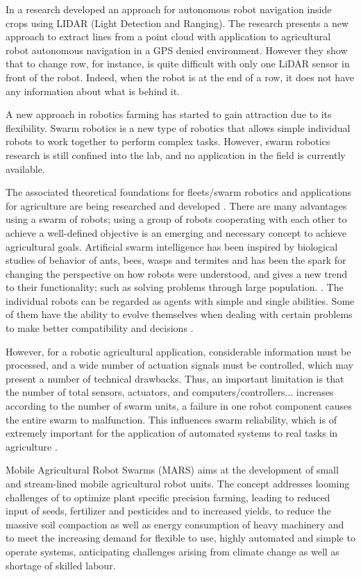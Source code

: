 \documentclass[review]{elsarticle}
\begin{document}
    In a research \cite{Malavazi_2018} developed an approach for autonomous robot navigation inside crops using LIDAR (Light Detection and Ranging). The research presents a new approach to extract lines from a point cloud with application to agricultural robot autonomous navigation in a GPS denied environment. However  they show that to change row, for instance, is quite difficult with only one LiDAR sensor in front of the robot. Indeed, when the robot is at the end of a row, it does not have any information about what is behind it. 

    A new approach in robotics farming has started to gain attraction due to its flexibility. Swarm robotics is a new type of robotics that allows simple individual robots to work together to perform complex tasks. However, swarm robotics research is still confined into the lab, and no application in the field is currently available.

    The associated theoretical foundations for fleets/swarm robotics and applications for agriculture are being researched and developed \cite{Emmi_2014}. There are many advantages using a swarm of robots; using a group of robots cooperating with each other to achieve a well-defined objective is an emerging and necessary concept to achieve agricultural goals. Artificial swarm intelligence has been inspired by biological studies of behavior of ants, bees, wasps and termites and has been the spark for changing the perspective on how robots were understood, and gives a new trend to their functionality; such as solving problems through large population. \cite{Anil_2015}. The individual robots can be regarded as agents with simple and single abilities. Some of them have the ability to evolve themselves when dealing with certain problems to make better compatibility and decisions \cite{Tan_2013}.

    However, for a robotic agricultural application, considerable information must be processed, and a wide number of actuation signals must be controlled, which may present a number of technical drawbacks. Thus, an important limitation is that the number of total sensors, actuators, and computers/controllers... increases according to the number of swarm units, a failure in one robot component causes the entire swarm to malfunction. This influences swarm reliability, which is of extremely important for the application of automated systems to real tasks in agriculture \cite{Emmi_2013}.

    Mobile Agricultural Robot Swarms (MARS) aims at the development of small and stream-lined mobile agricultural robot units. The concept addresses looming challenges of to optimize plant specific precision farming, leading to reduced input of seeds, fertilizer and pesticides and to increased yields, to reduce the massive soil compaction as well as energy consumption of heavy machinery and to meet the increasing demand for flexible to use, highly automated and simple to operate systems, anticipating challenges arising from climate change as well as shortage of skilled labour.
\end{document}
